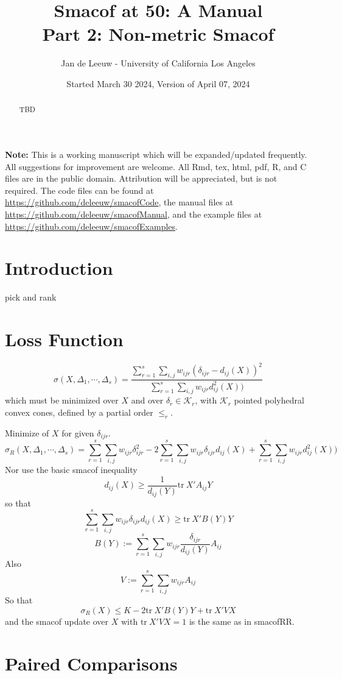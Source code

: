 \documentclass[
  12pt,
]{article}
\title{Smacof at 50: A Manual\\
Part 2: Non-metric Smacof}
\author{Jan de Leeuw - University of California Los Angeles}
\date{Started March 30 2024, Version of April 07, 2024}
\newcommand{\sectionbreak}{\clearpage}
\begin{document}
\maketitle
\begin{abstract}
TBD
\end{abstract}

{
\setcounter{tocdepth}{4}
\tableofcontents
}
\textbf{Note:} This is a working manuscript which will be expanded/updated
frequently. All suggestions for improvement are welcome. All Rmd, tex,
html, pdf, R, and C files are in the public domain. Attribution will be
appreciated, but is not required. The code files can be found at
\url{https://github.com/deleeuw/smacofCode}, the manual files at
\url{https://github.com/deleeuw/smacofManual}, and the example files
at \url{https://github.com/deleeuw/smacofExamples}.

\sectionbreak

\section{Introduction}\label{introduction}

pick and rank

\section{Loss Function}\label{loss-function}

\[
\sigma(X,\Delta_1,\cdots,\Delta_s)=\frac{\sum_{r=1}^s\sum_{i,j} w_{ijr}(\delta_{ijr}-d_{ij}(X))^2}{\sum_{r=1}^s\sum_{i,j} w_{ijr}d_{ij}^2(X))}
\]
which must be minimized over \(X\) and over \(\delta_r\in\mathcal{K}_r\), with \(\mathcal{K}_r\) pointed polyhedral convex cones, defined by a partial order
\(\leq_r\).

Minimize of \(X\) for given \(\delta_{ijr}\).
\[
\sigma_R(X,\Delta_1,\cdots,\Delta_s)=\sum_{r=1}^s\sum_{i,j} w_{ijr}\delta_{ijr}^2-2\sum_{r=1}^s\sum_{i,j} w_{ijr}\delta_{ijr}d_{ij}(X)+\sum_{r=1}^s\sum_{i,j} w_{ijr}d_{ij}^2(X))
\]
Nor use the basic smacof inequality
\[
d_{ij}(X)\geq\frac{1}{d_{ij}(Y)}\text{tr}\ X'A_{ij}Y 
\]
so that
\[
\sum_{r=1}^s\sum_{i,j} w_{ijr}\delta_{ijr}d_{ij}(X)\geq
\text{tr}\ X'B(Y)Y
\]
\[
B(Y):=\sum_{r=1}^s\sum_{i,j} w_{ijr}\frac{\delta_{ijr}}{d_{ij}(Y)}A_{ij}
\]
Also
\[
V:=\sum_{r=1}^s\sum_{i,j} w_{ijr}A_{ij}
\]
So that
\[
\sigma_R(X)\leq K-2\text{tr}\ X'B(Y)Y+\text{tr}\ X'VX
\]
and the smacof update over \(X\) with \(\text{tr}\ X'VX=1\) is the same
as in smacofRR.

\section{Paired Comparisons}\label{paired-comparisons}
\end{document}
